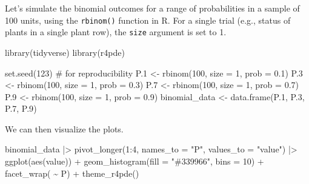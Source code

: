 \documentclass[
  letterpaper,
]{book}
\newenvironment{Shaded}{\begin{snugshade}}{\end{snugshade}}
\newcommand{\AttributeTok}[1]{\textcolor[rgb]{0.40,0.45,0.13}{#1}}
\newcommand{\CommentTok}[1]{\textcolor[rgb]{0.37,0.37,0.37}{#1}}
\newcommand{\DecValTok}[1]{\textcolor[rgb]{0.68,0.00,0.00}{#1}}
\newcommand{\FloatTok}[1]{\textcolor[rgb]{0.68,0.00,0.00}{#1}}
\newcommand{\FunctionTok}[1]{\textcolor[rgb]{0.28,0.35,0.67}{#1}}
\newcommand{\NormalTok}[1]{\textcolor[rgb]{0.00,0.23,0.31}{#1}}
\newcommand{\OtherTok}[1]{\textcolor[rgb]{0.00,0.23,0.31}{#1}}
\newcommand{\SpecialCharTok}[1]{\textcolor[rgb]{0.37,0.37,0.37}{#1}}
\newcommand{\StringTok}[1]{\textcolor[rgb]{0.13,0.47,0.30}{#1}}
\begin{document}
Let's simulate the binomial outcomes for a range of probabilities in a
sample of 100 units, using the \texttt{rbinom()} function in R. For a
single trial (e.g., status of plants in a single plant row), the
\texttt{size} argument is set to 1.

\begin{Shaded}
\begin{Highlighting}[]
\FunctionTok{library}\NormalTok{(tidyverse)}
\FunctionTok{library}\NormalTok{(r4pde)}


\FunctionTok{set.seed}\NormalTok{(}\DecValTok{123}\NormalTok{) }\CommentTok{\# for reproducibility}
\NormalTok{P}\FloatTok{.1} \OtherTok{\textless{}{-}} \FunctionTok{rbinom}\NormalTok{(}\DecValTok{100}\NormalTok{, }\AttributeTok{size =} \DecValTok{1}\NormalTok{, }\AttributeTok{prob =} \FloatTok{0.1}\NormalTok{)}
\NormalTok{P}\FloatTok{.3} \OtherTok{\textless{}{-}} \FunctionTok{rbinom}\NormalTok{(}\DecValTok{100}\NormalTok{, }\AttributeTok{size =} \DecValTok{1}\NormalTok{, }\AttributeTok{prob =} \FloatTok{0.3}\NormalTok{)}
\NormalTok{P}\FloatTok{.7} \OtherTok{\textless{}{-}} \FunctionTok{rbinom}\NormalTok{(}\DecValTok{100}\NormalTok{, }\AttributeTok{size =} \DecValTok{1}\NormalTok{, }\AttributeTok{prob =} \FloatTok{0.7}\NormalTok{)}
\NormalTok{P}\FloatTok{.9} \OtherTok{\textless{}{-}} \FunctionTok{rbinom}\NormalTok{(}\DecValTok{100}\NormalTok{, }\AttributeTok{size =} \DecValTok{1}\NormalTok{, }\AttributeTok{prob =} \FloatTok{0.9}\NormalTok{)}
\NormalTok{binomial\_data }\OtherTok{\textless{}{-}} \FunctionTok{data.frame}\NormalTok{(P}\FloatTok{.1}\NormalTok{, P}\FloatTok{.3}\NormalTok{, P}\FloatTok{.7}\NormalTok{, P}\FloatTok{.9}\NormalTok{)}
\end{Highlighting}
\end{Shaded}

We can then visualize the plots.

\begin{Shaded}
\begin{Highlighting}[]
\NormalTok{binomial\_data }\SpecialCharTok{|\textgreater{}}
  \FunctionTok{pivot\_longer}\NormalTok{(}\DecValTok{1}\SpecialCharTok{:}\DecValTok{4}\NormalTok{, }\AttributeTok{names\_to =} \StringTok{"P"}\NormalTok{,}
               \AttributeTok{values\_to =} \StringTok{"value"}\NormalTok{) }\SpecialCharTok{|\textgreater{}}
  \FunctionTok{ggplot}\NormalTok{(}\FunctionTok{aes}\NormalTok{(value)) }\SpecialCharTok{+}
  \FunctionTok{geom\_histogram}\NormalTok{(}\AttributeTok{fill =} \StringTok{"\#339966"}\NormalTok{,}
                 \AttributeTok{bins =} \DecValTok{10}\NormalTok{) }\SpecialCharTok{+}
  \FunctionTok{facet\_wrap}\NormalTok{( }\SpecialCharTok{\textasciitilde{}}\NormalTok{ P) }\SpecialCharTok{+}
  \FunctionTok{theme\_r4pde}\NormalTok{()}
\end{Highlighting}
\end{Shaded}
\end{document}
